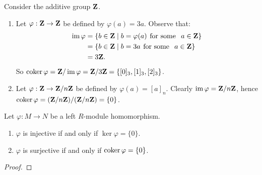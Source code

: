     \begin{example}
        Consider the additive group $\mathbf{Z}$.
        \begin{enumerate}[label = (\arabic*)]
            \item Let $\varphi: \mathbf{Z} \rightarrow \mathbf{Z}$ be defined by $\varphi(a) = 3a$. Observe that:
            \begin{equation*}
            \begin{split}
                \operatorname{im}{\varphi} &= \{b \in \mathbf{Z} \mid b = \varphi(a) \hspace{4pt} \text{for some } \hspace{4pt} a \in \mathbf{Z} \}\\
                & = \{b \in \mathbf{Z} \mid b = 3a \hspace{4pt} \text{for some } \hspace{4pt} a \in \mathbf{Z} \} \\
                & = 3\mathbf{Z}.
            \end{split}
            \end{equation*}
            So $ \operatorname{coker}{\varphi} = \mathbf{Z}/\operatorname{im}{\varphi} = \mathbf{Z}/3\mathbf{Z} = \{[0]_3, [1]_3 , [2]_3 \}$.
            \item Let $\varphi: \mathbf{Z} \rightarrow \mathbf{Z}/n\mathbf{Z}$ be defined by $\varphi(a) = [a]_n$. Clearly $\operatorname{im}{\varphi} = \mathbf{Z}/n\mathbf{Z}$, hence $\operatorname{coker}{\varphi} = (\mathbf{Z}/n\mathbf{Z})/(\mathbf{Z}/n\mathbf{Z}) = \{0\}$.
        \end{enumerate}
    \end{example}

    \begin{proposition}
        \item Let $\varphi: M \rightarrow N$ be a left $R$-module homomorphism.
        \begin{enumerate}[label = (\arabic*)]
            \item $\varphi$ is injective if and only if $\ker{\varphi} = \{0\}$.
            \item $\varphi$ is surjective if and only if $\operatorname{coker}{\varphi} = \{0\}$.
        \end{enumerate}
    \end{proposition}
        \begin{proof}
            
        \end{proof}

